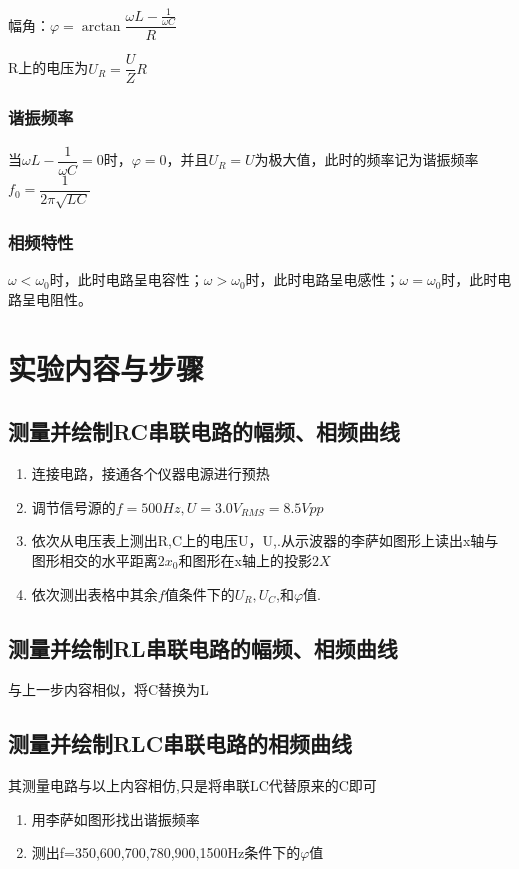 幅角：$\varphi=\arctan \dfrac{\omega L-\frac 1 {\omega C}}{R}$

R上的电压为$U_R=\dfrac{U}{Z}R $
\subsubsection{谐振频率}
当$\omega L-\dfrac{1}{\omega C}=0$时，$\varphi=0$，并且$U_R=U$为极大值，此时的频率记为谐振频率$f_0=\dfrac{1}{2\pi\sqrt{LC}}$
\subsubsection{相频特性}
$\omega <\omega _0 $时，此时电路呈电容性；$\omega >\omega _0 $时，此时电路呈电感性；$\omega =\omega _0 $时，此时电路呈电阻性。
\section{实验内容与步骤}
\subsection{测量并绘制RC串联电路的幅频、相频曲线}
\begin{enumerate}[(1)]
    \item 连接电路，接通各个仪器电源进行预热
    \item 调节信号源的$f=500Hz,U=3.0V_{RMS}=8.5Vpp$
    \item 依次从电压表上测出R,C上的电压U，U,.从示波器的李萨如图形上读出x轴与  图形相交的水平距离$2x_0$和图形在x轴上的投影$2X$
    \item 依次测出表格中其余$f$值条件下的$U_R,U_C$,和$\varphi$值.
\end{enumerate}
\subsection{测量并绘制RL串联电路的幅频、相频曲线}
与上一步内容相似，将C替换为L
\subsection{测量并绘制RLC串联电路的相频曲线}
其测量电路与以上内容相仿,只是将串联LC代替原来的C即可
\begin{enumerate}[(1)]
    \item 用李萨如图形找出谐振频率
    \item 测出f=350,600,700,780,900,1500Hz条件下的$\varphi$值
\end{enumerate}

